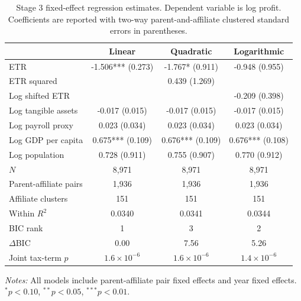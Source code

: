 \begin{table}[H]
\centering
\small
\caption[Stage 3 fixed-effect regression estimates]{Stage 3 fixed-effect regression estimates. Dependent variable is log profit. Coefficients are reported with two-way parent-and-affiliate clustered standard errors in parentheses.}
\label{tab:stage3_regression_table}
\begin{tabular}{@{}lccc@{}}
\toprule
 & Linear & Quadratic & Logarithmic \\
\midrule
ETR & -1.506*** (0.273) & -1.767* (0.911) & -0.948 (0.955) \\
ETR squared &  &  0.439 (1.269) &  \\
Log shifted ETR &  &  & -0.209 (0.398) \\
Log tangible assets & -0.017 (0.015) & -0.017 (0.015) & -0.017 (0.015) \\
Log payroll proxy &  0.023 (0.034) &  0.023 (0.034) &  0.023 (0.034) \\
Log GDP per capita &  0.675*** (0.109) &  0.676*** (0.109) &  0.676*** (0.108) \\
Log population &  0.728 (0.911) &  0.755 (0.907) &  0.770 (0.912) \\
\midrule
$N$ & 8,971 & 8,971 & 8,971 \\
Parent-affiliate pairs & 1,936 & 1,936 & 1,936 \\
Affiliate clusters &   151 &   151 &   151 \\
Within $R^2$ &     0.0340 &     0.0341 &     0.0344 \\
BIC rank &     1 &     3 &     2 \\
$\Delta$BIC &     0.00 &     7.56 &     5.26 \\
Joint tax-term $p$ & $1.6 \times 10^{-6}$ & $1.6 \times 10^{-6}$ & $1.4 \times 10^{-6}$ \\
\bottomrule
\end{tabular}

\vspace{0.5em}
\begin{minipage}{0.96\textwidth}
\footnotesize\raggedright \textit{Notes:} All models include parent-affiliate pair fixed effects and year fixed effects. $^{*}p<0.10$, $^{**}p<0.05$, $^{***}p<0.01$. 
\end{minipage}
\end{table}

